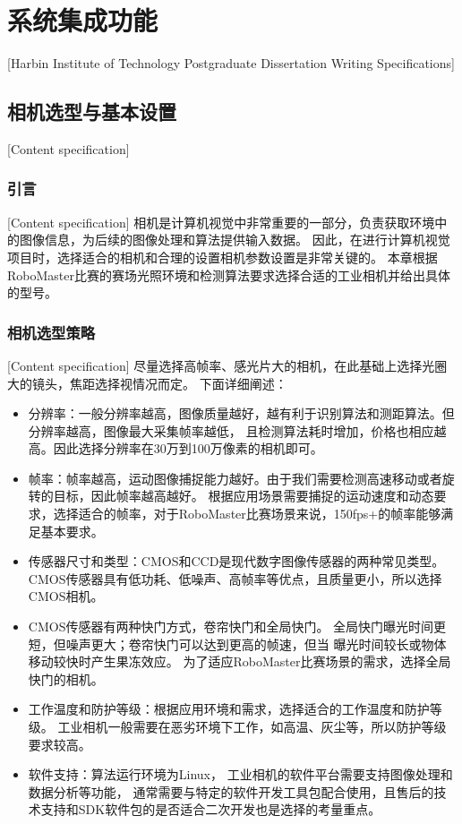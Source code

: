 

\chapter[系统集成功能]{系统集成功能}[Harbin Institute of Technology Postgraduate Dissertation Writing Specifications]

\section{相机选型与基本设置}[Content specification]

\subsection{引言}[Content specification]
相机是计算机视觉中非常重要的一部分，负责获取环境中的图像信息，为后续的图像处理和算法提供输入数据。
因此，在进行计算机视觉项目时，选择适合的相机和合理的设置相机参数设置是非常关键的。
本章根据RoboMaster比赛的赛场光照环境和检测算法要求选择合适的工业相机并给出具体的型号。

\subsection{相机选型策略}[Content specification]
尽量选择高帧率、感光片大的相机，在此基础上选择光圈大的镜头，焦距选择视情况而定。
下面详细阐述：\par

\begin{itemize}[itemindent=2em]
    \item 分辨率：一般分辨率越高，图像质量越好，越有利于识别算法和测距算法。但分辨率越高，图像最大采集帧率越低，
    且检测算法耗时增加，价格也相应越高。因此选择分辨率在30万到100万像素的相机即可。
    \item 帧率：帧率越高，运动图像捕捉能力越好。由于我们需要检测高速移动或者旋转的目标，因此帧率越高越好。
    根据应用场景需要捕捉的运动速度和动态要求，选择适合的帧率，对于RoboMaster比赛场景来说，150fps+的帧率能够满足基本要求。
    \item 传感器尺寸和类型：CMOS和CCD是现代数字图像传感器的两种常见类型。
    CMOS传感器具有低功耗、低噪声、高帧率等优点，且质量更小，所以选择CMOS相机。
    \item CMOS传感器有两种快门方式，卷帘快门和全局快门\cite{huang2023review}。
    全局快门曝光时间更短，但噪声更大；卷帘快门可以达到更高的帧速，但当
    曝光时间较长或物体移动较快时产生果冻效应。
    为了适应RoboMaster比赛场景的需求，选择全局快门的相机。
    \item 工作温度和防护等级：根据应用环境和需求，选择适合的工作温度和防护等级。
    工业相机一般需要在恶劣环境下工作，如高温、灰尘等，所以防护等级要求较高。
    \item 软件支持：算法运行环境为Linux，
    工业相机的软件平台需要支持图像处理和数据分析等功能，
    通常需要与特定的软件开发工具包配合使用，且售后的技术支持和SDK软件包的是否适合二次开发也是选择的考量重点。

\end{itemize}


